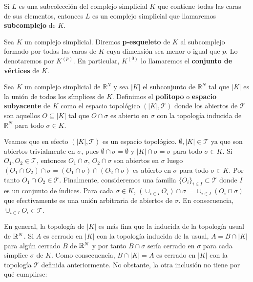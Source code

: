 \begin{definicion}
	Si $L$ es una subcolección del complejo simplicial $K$ que contiene todas las caras
	de sus elementos, entonces $L$ es un complejo simplicial que llamaremos
	\textbf{subcomplejo} de $K$.
\end{definicion}
\begin{definicion}
	Sea $K$ un complejo simplicial. Diremos \textbf{p-esqueleto} de $K$ al subcomplejo
	formado por todas las caras de $K$ cuya dimensión sea menor o igual que $p$.
	Lo denotaremos por $K^{(p)}$. En particular, $K^{(0)}$ lo llamaremos el
	\textbf{conjunto de vértices} de $K$.
\end{definicion}
\begin{definicion}
	Sea $K$ un complejo simplicial de $\mathbb{R}^{N}$ y sea $|K|$ el subconjunto de
	$\mathbb{R}^{N}$ tal que $|K|$ es la unión de todos los símplices de $K$.
	Definimos el \textbf{politopo} o \textbf{espacio subyacente} de $K$ como el
	espacio topológico $(|K|, \mathcal{T})$ donde los abiertos de $\mathcal{T}$
	son aquellos $O \subseteq |K|$ tal que $O \cap \sigma$ es abierto en $\sigma$
	con la topología inducida de $\mathbb{R}^{N}$ para todo $\sigma \in K$.
\end{definicion}

Veamos que en efecto $(|K|, \mathcal{T})$ es un espacio topológico.
$\emptyset, | K| \in \mathcal{T}$ ya que son abiertos trivialmente en $\sigma$, pues
$\emptyset \cap \sigma = \emptyset$ y $|K| \cap \sigma = \sigma$ para todo $\sigma
\in K$. Si $O_{1}, O_{2}\in \mathcal{T}$, entonces $O_{1}\cap \sigma$,
$O_{2}\cap \sigma$ son abiertos en $\sigma$ luego
$(O_{1}\cap O_{2}) \cap \sigma = (O_{1}\cap \sigma) \cap (O_{2}\cap \sigma)$ es
abierto en $\sigma$ para todo $\sigma \in K$. Por tanto $O_{1}\cap O_{2}\in \mathcal{T}$.
Finalmente, consideremos una familia $\{O_{i}\}_{i \in I}\subset \mathcal{T}$ donde
$I$ es un conjunto de índices. Para cada $\sigma \in K$, $(\cup_{i \in I}O_{i}) \cap
\sigma = \cup_{i \in I}(O_{i}\cap \sigma)$ que efectivamente es una unión arbitraria
de abiertos de $\sigma$. En consecuencia, $\cup_{i \in I}O_{i}\in \mathcal{T}$.

En general, la topología de $|K|$ es más fina que la inducida de la topología
usual de $\mathbb{R}^{N}$. Si $A$ es cerrado en $|K|$ con la topología inducida de la usual,
$A =B \cap |K|$ para algún cerrado $B$ de $\mathbb{R}^{N}$ y por tanto $B \cap \sigma$
sería cerrado en $\sigma$ para cada símplice $\sigma$ de $K$. Como consecuencia,
$B \cap |K|=A$ es cerrado en $|K|$ con la topología $\mathcal{T}$ definida
anteriormente. No obstante, la otra inclusión no tiene por qué cumplirse:

